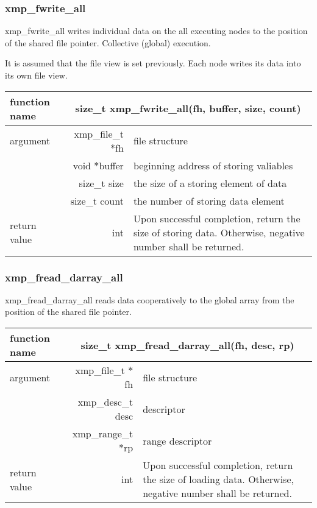    \subsubsection{xmp\_fwrite\_all}
   xmp\_fwrite\_all writes individual data on the all executing nodes to the position of the shared file
   pointer. Collective (global) execution.

   It is assumed that the file view is set previously. Each node writes its data into its own file view.

   \begin{table}[h]
    \begin{center}
     \begin{tabular}{|l|r|p{80mm}|}
      \hline
      {\bf function name}  & \multicolumn{2}{c|}{\bf size\_t
      xmp\_fwrite\_all(fh, buffer, size, count)}  \\ \hline \hline
      argument & xmp\_file\_t $*$fh & file structure \\ \cline{2-3}
      & void $*$buffer & beginning address of storing valiables \\ \cline{2-3}
      & size\_t size & the size of a storing element of data \\ \cline{2-3}
      & size\_t count & the number of storing data element \\ \hline
      return value & int & Upon successful completion, return the size
	      of storing data. Otherwise, negative number shall be
	      returned. \\ \hline
      \end{tabular}
     \end{center}
    \label{tb:aaa}
   \end{table}

   \subsubsection{xmp\_fread\_darray\_all}
   xmp\_fread\_darray\_all reads data cooperatively to the global array from the position of the shared file pointer.

   \clearpage

   \begin{table}[h]
    \begin{center}
     \begin{tabular}{|l|r|p{80mm}|}
      \hline
      {\bf function name}  & \multicolumn{2}{c|}{\bf size\_t
      xmp\_fread\_darray\_all(fh, desc, rp)} \\ \hline \hline
      argument & xmp\_file\_t $*$fh & file structure \\ \cline{2-3}
      & xmp\_desc\_t desc & descriptor \\ \cline{2-3}
      & xmp\_range\_t $*$rp & range descriptor \\ \hline
      return value & int & Upon successful completion, return the size
	      of loading data. Otherwise, negative number shall be
	      returned. \\ \hline
      \end{tabular}
     \end{center}
    \label{tb:aaa}
   \end{table}

